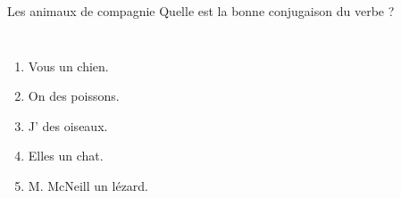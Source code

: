 \begin{frame}{Les animaux de compagnie }
  Quelle est la bonne conjugaison du verbe ? \\
  \begin{columns}
      \begin{enumerate}
        \item Vous \underline{} un chien.
        \item On \underline{} des poissons.
        \item J'\underline{} des oiseaux.
        \item Elles \underline{} un chat.
        \item M. McNeill \underline{} un lézard.
      \end{enumerate}
      \begin{minipage}[c][0.6\textheight]{\linewidth}
        \begin{center}
        \end{center}
      \end{minipage}
  \end{columns}
\end{frame}